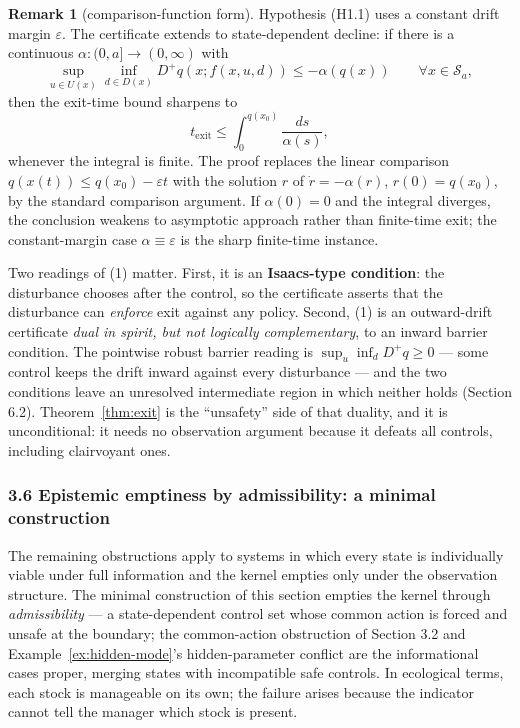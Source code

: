 \documentclass[10pt,twocolumn]{article}
\theoremstyle{definition}
\newtheorem{remark}{Remark}
\begin{document}
\begin{remark}[comparison-function form]\label{rem:comparison}
Hypothesis (H1.1) uses a constant drift margin \(\varepsilon\). The
certificate extends to state-dependent decline: if there is a continuous
\(\alpha:(0,a]\to(0,\infty)\) with
\[\sup_{u\in U(x)}\inf_{d\in D(x)} D^+q(x; f(x,u,d)) \le -\alpha(q(x)) \qquad \forall x\in\mathcal{S}_a,\]
then the exit-time bound sharpens to
\[t_{\mathrm{exit}} \le \int_0^{q(x_0)} \frac{ds}{\alpha(s)},\]
whenever the integral is finite. The proof replaces the linear comparison
\(q(x(t))\le q(x_0)-\varepsilon t\) with the solution \(r\) of
\(\dot r=-\alpha(r)\), \(r(0)=q(x_0)\), by the standard comparison
argument. If \(\alpha(0)=0\) and the integral diverges, the conclusion
weakens to asymptotic approach rather than finite-time exit; the
constant-margin case \(\alpha\equiv\varepsilon\) is the sharp finite-time
instance.
\end{remark}

Two readings of (1) matter. First, it is an \textbf{Isaacs-type
condition}: the disturbance chooses after the control, so the
certificate asserts that the disturbance can \emph{enforce} exit against
any policy. Second, (1) is an outward-drift certificate \emph{dual in
spirit, but not logically complementary}, to an inward barrier
condition. The pointwise robust barrier reading is
\(\sup_u \inf_d D^+ q \ge 0\) --- some control keeps the drift inward
against every disturbance --- and the two conditions leave an unresolved
intermediate region in which neither holds (Section 6.2). Theorem~\ref{thm:exit} is
the ``unsafety'' side of that duality, and it is unconditional: it needs
no observation argument because it defeats all controls, including
clairvoyant ones.

\subsubsection{3.6 Epistemic emptiness by admissibility: a minimal
construction}\label{epistemic-emptiness-by-admissibility-a-minimal-construction}

The remaining obstructions apply to systems in which every state is
individually viable under full information and the kernel empties only under the observation structure.
The minimal construction of this section empties the kernel through
\emph{admissibility} --- a state-dependent control set whose common
action is forced and unsafe at the boundary; the common-action
obstruction of Section 3.2 and Example~\ref{ex:hidden-mode}'s hidden-parameter
conflict are the informational cases proper, merging states with
incompatible safe controls. In ecological terms, each stock is manageable on its own; the failure arises because the indicator cannot tell the manager which stock is present.
\end{document}

